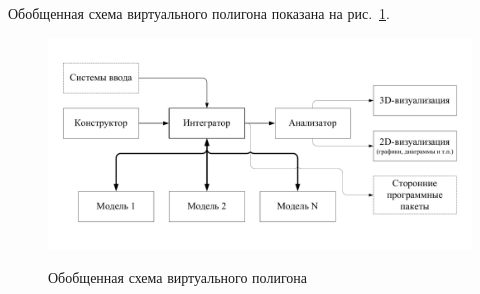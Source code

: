 Обобщенная схема виртуального полигона показана на рис.~\ref{vtb_concept}.

\begin{figure}
\begin{center}
	\includegraphics[width=130mm]{vtb_concept}
	\label{vtb_concept}
	\caption{Обобщенная схема виртуального полигона}
\end{center}
\end{figure}

